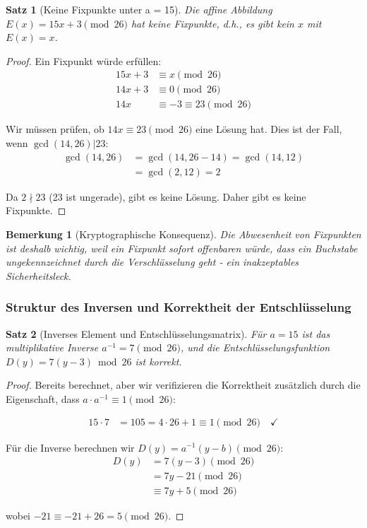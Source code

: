﻿\documentclass[12pt,a4paper]{article}
\newtheorem{theorem}{Satz}
\newtheorem{remark}{Bemerkung}
\begin{document}
	\begin{theorem}[Keine Fixpunkte unter a = 15]
		Die affine Abbildung $E(x) = 15x + 3 \pmod{26}$ hat keine Fixpunkte, d.h., es gibt kein $x$ mit $E(x) = x$.
	\end{theorem}
	
	\begin{proof}
		Ein Fixpunkt würde erfüllen:
		\begin{align}
			15x + 3 &\equiv x \pmod{26} \\
			14x + 3 &\equiv 0 \pmod{26} \\
			14x &\equiv -3 \equiv 23 \pmod{26}
		\end{align}
		
		Wir müssen prüfen, ob $14x \equiv 23 \pmod{26}$ eine Lösung hat. Dies ist der Fall, wenn $\gcd(14, 26) | 23$:
		\begin{align}
			\gcd(14, 26) &= \gcd(14, 26 - 14) = \gcd(14, 12) \\
			&= \gcd(2, 12) = 2
		\end{align}
		
		Da $2 \nmid 23$ (23 ist ungerade), gibt es keine Lösung. Daher gibt es keine Fixpunkte. \checkmark
	\end{proof}
	
	\begin{remark}[Kryptographische Konsequenz]
		Die Abwesenheit von Fixpunkten ist deshalb wichtig, weil ein Fixpunkt sofort offenbaren würde, dass ein Buchstabe ungekennzeichnet durch die Verschlüsselung geht - ein inakzeptables Sicherheitsleck.
	\end{remark}
	
	\subsubsection{Struktur des Inversen und Korrektheit der Entschlüsselung}
	
	\begin{theorem}[Inverses Element und Entschlüsselungsmatrix]
		Für $a = 15$ ist das multiplikative Inverse $a^{-1} = 7 \pmod{26}$, und die Entschlüsselungsfunktion $D(y) = 7(y - 3) \bmod 26$ ist korrekt.
	\end{theorem}
	
	\begin{proof}
		Bereits berechnet, aber wir verifizieren die Korrektheit zusätzlich durch die Eigenschaft, dass $a \cdot a^{-1} \equiv 1 \pmod{26}$:
		
		\begin{align}
			15 \cdot 7 &= 105 = 4 \cdot 26 + 1 \equiv 1 \pmod{26} \quad \checkmark
		\end{align}
		
		Für die Inverse berechnen wir $D(y) = a^{-1}(y - b) \pmod{26}$:
		\begin{align}
			D(y) &= 7(y - 3) \pmod{26} \\
			&= 7y - 21 \pmod{26} \\
			&\equiv 7y + 5 \pmod{26}
		\end{align}
		
		wobei $-21 \equiv -21 + 26 = 5 \pmod{26}$.
	\end{proof}
	
\end{document}
